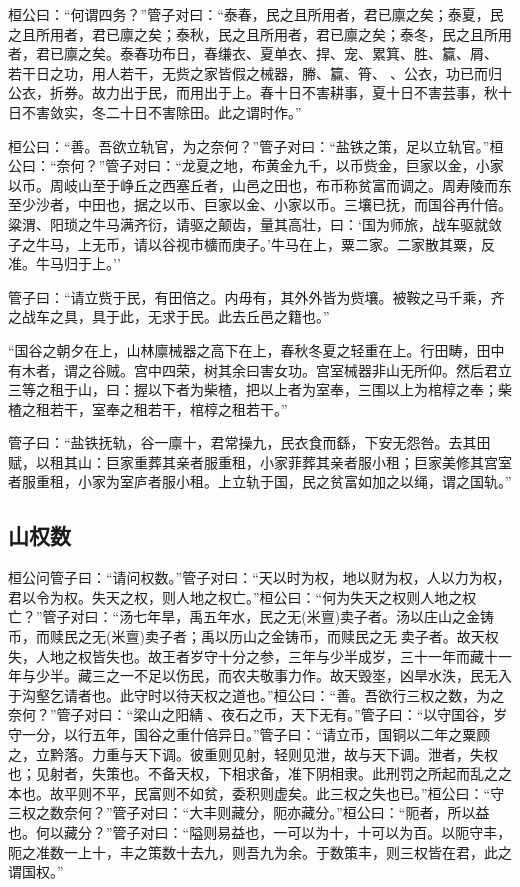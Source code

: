 \documentclass[]{article}
\begin{document}
桓公曰：``何谓四务？''管子对曰：``泰春，民之且所用者，君已廪之矣；泰夏，民之且所用者，君已廪之矣；泰秋，民之且所用者，君已廪之矣；泰冬，民之且所用者，君已廪之矣。泰春功布日，春缣衣、夏单衣、捍、宠、累箕、胜、籯、屑、，若干日之功，用人若干，无赀之家皆假之械器，幐、籯、筲、、公衣，功已而归公衣，折券。故力出于民，而用出于上。春十日不害耕事，夏十日不害芸事，秋十日不害敛实，冬二十日不害除田。此之谓时作。''

桓公曰：``善。吾欲立轨官，为之奈何？''管子对曰：``盐铁之策，足以立轨官。''桓公曰：``奈何？''管子对曰：``龙夏之地，布黄金九千，以币赀金，巨家以金，小家以币。周岐山至于峥丘之西塞丘者，山邑之田也，布币称贫富而调之。周寿陵而东至少沙者，中田也，据之以币、巨家以金、小家以币。三壤已抚，而国谷再什倍。粱渭、阳琐之牛马满齐衍，请驱之颠齿，量其高壮，曰：`国为师旅，战车驱就敛子之牛马，上无币，请以谷视市櫎而庚子。'牛马在上，粟二家。二家散其粟，反准。牛马归于上。''

管子曰：``请立赀于民，有田倍之。内毋有，其外外皆为赀壤。被鞍之马千乘，齐之战车之具，具于此，无求于民。此去丘邑之籍也。''

``国谷之朝夕在上，山林廪械器之高下在上，春秋冬夏之轻重在上。行田畴，田中有木者，谓之谷贼。宫中四荣，树其余曰害女功。宫室械器非山无所仰。然后君立三等之租于山，曰：握以下者为柴楂，把以上者为室奉，三围以上为棺椁之奉；柴楂之租若干，室奉之租若干，棺椁之租若干。''

管子曰：``盐铁抚轨，谷一廪十，君常操九，民衣食而繇，下安无怨咎。去其田赋，以租其山：巨家重葬其亲者服重租，小家菲葬其亲者服小租；巨家美修其宫室者服重租，小家为室庐者服小租。上立轨于国，民之贫富如加之以绳，谓之国轨。''

\hypertarget{header-n998}{%
\subsection{山权数}\label{header-n998}}

桓公问管子曰：``请问权数。''管子对曰：``天以时为权，地以财为权，人以力为权，君以令为权。失天之权，则人地之权亡。''桓公曰：``何为失天之权则人地之权亡？''管子对曰：``汤七年旱，禹五年水，民之无(米亶)卖子者。汤以庄山之金铸币，而赎民之无(米亶)卖子者；禹以历山之金铸币，而赎民之无卖子者。故天权失，人地之权皆失也。故王者岁守十分之参，三年与少半成岁，三十一年而藏十一年与少半。藏三之一不足以伤民，而农夫敬事力作。故天毁埊，凶旱水泆，民无入于沟壑乞请者也。此守时以待天权之道也。''桓公曰：``善。吾欲行三权之数，为之奈何？''管子对曰：``梁山之阳綪、夜石之币，天下无有。''管子曰：``以守国谷，岁守一分，以行五年，国谷之重什倍异日。''管子曰：``请立币，国铜以二年之粟顾之，立黔落。力重与天下调。彼重则见射，轻则见泄，故与天下调。泄者，失权也；见射者，失策也。不备天权，下相求备，准下阴相隶。此刑罚之所起而乱之之本也。故平则不平，民富则不如贫，委积则虚矣。此三权之失也已。''桓公曰：``守三权之数奈何？''管子对曰：``大丰则藏分，阨亦藏分。''桓公曰：``阨者，所以益也。何以藏分？''管子对曰：``隘则易益也，一可以为十，十可以为百。以阨守丰，阨之准数一上十，丰之策数十去九，则吾九为余。于数策丰，则三权皆在君，此之谓国权。''
\end{document}
